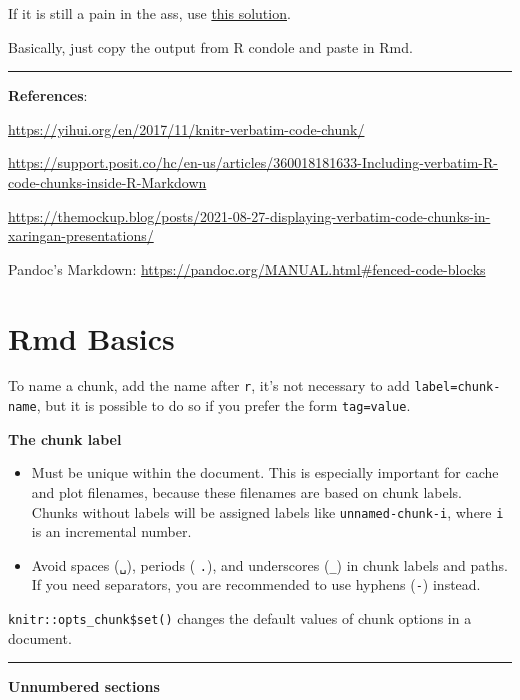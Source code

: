 \documentclass[
  a4paper,
  twoside,
  openright]{book}
\providecommand{\tightlist}{%
  \setlength{\itemsep}{0pt}\setlength{\parskip}{0pt}}
\theoremstyle{definition}
\theoremstyle{definition}
\theoremstyle{definition}
\theoremstyle{definition}
\theoremstyle{remark}
\begin{document}
If it is still a pain in the ass, use \href{https://tex.stackexchange.com/a/594904}{this solution}.

Basically, just copy the output from R condole and paste in Rmd.

\begin{center}\rule{0.5\linewidth}{0.5pt}\end{center}

\textbf{References}:

\url{https://yihui.org/en/2017/11/knitr-verbatim-code-chunk/}

\url{https://support.posit.co/hc/en-us/articles/360018181633-Including-verbatim-R-code-chunks-inside-R-Markdown}

\url{https://themockup.blog/posts/2021-08-27-displaying-verbatim-code-chunks-in-xaringan-presentations/}

Pandoc's Markdown: \url{https://pandoc.org/MANUAL.html\#fenced-code-blocks}

\section{Rmd Basics}\label{rmd-basics}

To name a chunk, add the name after \texttt{r}, it's not necessary to add \texttt{label=\textquotesingle{}chunk-name\textquotesingle{}}, but it is possible to do so if you prefer the form \texttt{tag=value}.

\textbf{The chunk label}

\begin{itemize}
\tightlist
\item
  Must be unique within the document. This is especially important for cache and plot filenames, because these filenames are based on chunk labels. Chunks without labels will be assigned labels like \texttt{unnamed-chunk-i}, where \texttt{i} is an incremental number.
\item
  Avoid spaces (\texttt{␣}), periods ( \texttt{.}), and underscores (\texttt{\_}) in chunk labels and paths. If you need separators, you are recommended to use hyphens (\texttt{-}) instead.
\end{itemize}

\texttt{knitr::opts\_chunk\$set()} changes the default values of chunk options in a document.

\begin{center}\rule{0.5\linewidth}{0.5pt}\end{center}

\textbf{Unnumbered sections}
\end{document}
